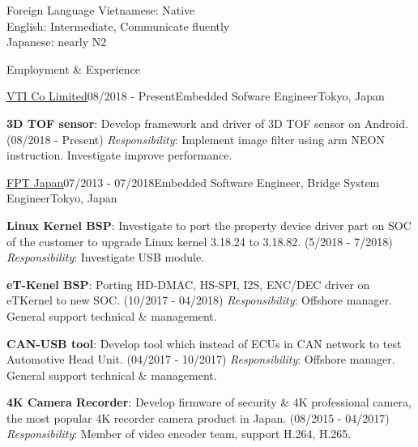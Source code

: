 \documentclass{resume}
\begin{document}
  \begin{rSection}{Foreign Language}
    Vietnamese: Native \\
    English: Intermediate, Communicate fluently \\
    Japanese: nearly N2
  \end{rSection}

  \begin{rSection}{Employment \& Experience}
  
    \begin{rSubsection}{\href{https://www.vti.com.vn/company-vti-japan/}{\underline{VTI Co Limited}}}{08/2018 - Present}{Embedded Sofware Engineer}{Tokyo, Japan}
    \item \textbf{3D TOF sensor}: Develop framework and driver of 3D TOF sensor on Android. (08/2018 - Present)
    \newline \textit{Responsibility}: Implement image filter using arm NEON instruction. Investigate improve performance.
    \end{rSubsection}
  
    \begin{rSubsection}{\href{https://www.fpt-software.jp/company-information/fpt-japan/}{\underline{FPT Japan}}}{07/2013 - 07/2018}{Embedded Software Engineer, Bridge System Engineer}{Tokyo, Japan}
    \item \textbf{Linux Kernel BSP}: Investigate to port the property device driver part on SOC of the customer to upgrade Linux kernel 3.18.24 to 3.18.82. (5/2018 - 7/2018)
    \newline \textit{Responsibility}: Investigate USB module.

    \item \textbf{eT-Kenel BSP}: Porting HD-DMAC, HS-SPI, I2S, ENC/DEC driver on eTKernel to new SOC. (10/2017 - 04/2018)
    \newline \textit{Responsibility}: Offshore manager. General support technical \& management.

    \item \textbf{CAN-USB tool}: Develop tool which instead of ECUs in CAN network to test Automotive Head Unit. (04/2017 - 10/2017) 
    \newline \textit{Responsibility}: Offshore manager. General support technical \& management.

    \item \textbf{4K Camera Recorder}: Develop firmware of security \& 4K professional camera, the most popular 4K recorder camera product in Japan. (08/2015 - 04/2017)
    \newline \textit{Responsibility}: Member of video encoder team, support H.264, H.265.


\end{rSubsection}
\end{rSection}
\end{document}
